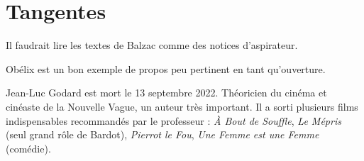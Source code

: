\documentclass[a4paper,12pt]{book}
\begin{document}
\chapter{Tangentes}
Il faudrait lire les textes de Balzac comme des notices d'aspirateur.
\par Obélix est un bon exemple de propos peu pertinent en tant qu'ouverture.
\par Jean-Luc Godard est mort le 13 septembre 2022. Théoricien du cinéma et cinéaste de la Nouvelle Vague, un auteur très important. Il a sorti plusieurs films indispensables recommandés par le professeur : \textit{À Bout de Souffle}, \textit{Le Mépris} (seul grand rôle de Bardot), \textit{Pierrot le Fou}, \textit{Une Femme est une Femme} (comédie).
\end{document}
